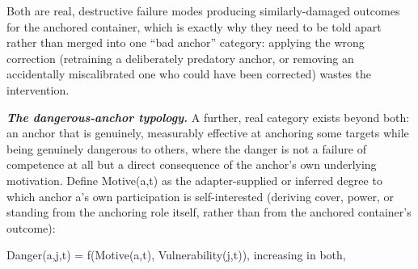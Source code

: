 \documentclass[
]{article}
\begin{document}
Both are real, destructive failure modes producing similarly-damaged
outcomes for the anchored container, which is exactly why they need to
be told apart rather than merged into one ``bad anchor'' category:
applying the wrong correction (retraining a deliberately predatory
anchor, or removing an accidentally miscalibrated one who could have
been corrected) wastes the intervention.

\emph{\textbf{The dangerous-anchor typology.}} A further, real category
exists beyond both: an anchor that is genuinely, measurably effective at
anchoring some targets while being genuinely dangerous to others, where
the danger is not a failure of competence at all but a direct
consequence of the anchor's own underlying motivation. Define
Motive(a,t) as the adapter-supplied or inferred degree to which anchor
a's own participation is self-interested (deriving cover, power, or
standing from the anchoring role itself, rather than from the anchored
container's outcome):

Danger(a,j,t) = f(Motive(a,t), Vulnerability(j,t)), increasing in both,
\end{document}
